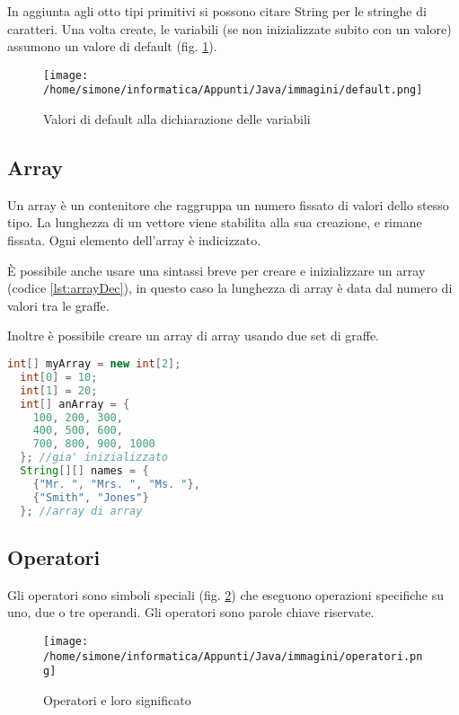\documentclass[a4paper,12pt,twoside]{book}
\begin{document}
In aggiunta agli otto tipi primitivi si possono citare String per le
stringhe di caratteri.
Una volta create, le variabili (se non inizializzate subito con un
valore) assumono un valore di default (fig. \ref{fig:default}).

\begin{figure}
  \centering
  \texttt{[image: /home/simone/informatica/Appunti/Java/immagini/default.png]}
  \caption{Valori di default alla dichiarazione delle variabili \label{fig:default}}
\end{figure}

\subsection{Array}

Un array è un contenitore che raggruppa un numero fissato di valori
dello stesso tipo. La lunghezza di un vettore viene stabilita alla sua
creazione, e rimane fissata. Ogni elemento dell'array è indicizzato.

È possibile anche usare una sintassi breve per creare e inizializzare
un array (codice \ref{lst:arrayDec}), in questo caso la lunghezza di
array è data dal numero di valori tra le graffe.

Inoltre è possibile creare un array di array usando due set di graffe.

\begin{lstlisting}[caption={Dichiarazione array},
  label={lst:arrayDec},language=Java]
  int[] myArray = new int[2];
  int[0] = 10;
  int[1] = 20;
  int[] anArray = { 
    100, 200, 300,
    400, 500, 600, 
    700, 800, 900, 1000
  }; //gia' inizializzato
  String[][] names = {
    {"Mr. ", "Mrs. ", "Ms. "},
    {"Smith", "Jones"}
  }; //array di array
\end{lstlisting}

\subsection{Operatori}

Gli operatori sono simboli speciali (fig. \ref{fig:operatori}) che
eseguono operazioni specifiche su uno, due o tre operandi. Gli
operatori sono parole chiave riservate.

\begin{figure}
  \centering
  \texttt{[image: /home/simone/informatica/Appunti/Java/immagini/operatori.png]}
  \caption{Operatori e loro significato \label{fig:operatori}}
\end{figure}
\end{document}
